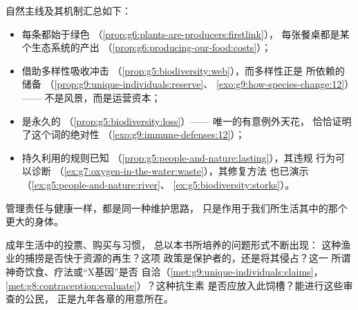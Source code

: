 \begin{proposition}\label{prop:g9:our-responsibility:stewardship}
自然主线及其机制汇总如下：
\begin{itemize}
  \item 每条都始于绿色
        （\cref{prop:g6:plants-are-producers:firstlink}），
        每张餐桌都是某个生态系统的产出
        （\cref{prop:g6:producing-our-food:costs}）；
  \item {}借助多样性吸收冲击
        （\cref{prop:g5:biodiversity:web}），而多样性正是
        所依赖的储备
        （\cref{prop:g9:unique-individuals:reserve}、
        \cref{exo:g9:how-species-change:12}）——
        不是风景，而是运营资本；
  \item {}是永久的
        （\cref{prop:g5:biodiversity:loss}）——
        唯一的有意例外天花，
        恰恰证明了这个词的绝对性
        （\cref{exo:g9:immune-defenses:12}）；
  \item 持久利用的规则已知
        （\cref{prop:g5:people-and-nature:lasting}），其违规
        行为可以诊断
        （\cref{ex:g7:oxygen-in-the-water:waste}），其修复方法
        也已演示
        （\cref{ex:g5:people-and-nature:river}、
        \cref{ex:g5:biodiversity:storks}）。
\end{itemize}
管理责任与健康一样，都是同一种维护思路，
只是作用于我们所生活其中的那个更大的身体。
\end{proposition}
\admitted

\begin{example}[公民的生物学有何用]\label{ex:g9:our-responsibility:citizen}
成年生活中的投票、购买与习惯，
总以本书所培养的问题形式不断出现：
这种渔业的捕捞是否快于资源的再生？这项
政策是保护者的，还是将其侵占？这一
所谓神奇饮食、疗法或“X基因”是否
自洽（\cref{met:g9:unique-individuals:claims}，
\cref{met:g8:contraception:evaluate}）？这种抗生素
是否应放入此饲槽？能进行这些审查的公民，
正是九年各章的用意所在。
\end{example}

